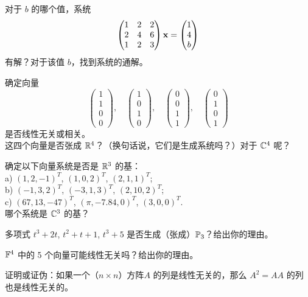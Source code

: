 \begin{problemset}
\item \label{ex:02-03-01} 对于 $b$ 的哪个值，系统 $$\begin{pmatrix} 1 & 2 & 2 \\ 2 & 4 & 6 \\ 1 & 2 & 3 \end{pmatrix} \mathbf{x} = \begin{pmatrix} 1 \\ 4 \\ b \end{pmatrix}$$ 有解？对于该值 $b$，找到系统的通解。
\item \label{ex:02-03-02} 确定向量
$$\begin{pmatrix} 1 \\ 1 \\ 0 \\ 0 \end{pmatrix},\quad \begin{pmatrix} 1 \\ 0 \\ 1 \\ 0 \end{pmatrix},\quad \begin{pmatrix} 0 \\ 0 \\ 1 \\ 1 \end{pmatrix},\quad \begin{pmatrix} 0 \\ 1 \\ 0 \\ 1 \end{pmatrix}$$
是否线性无关或相关。
\\
这四个向量是否张成 $\mathbb{R}^4$？（换句话说，它们是生成系统吗？）对于 $\mathbb{C}^4$ 呢？
\item \label{ex:02-03-03} 确定以下向量系统是否是 $\mathbb{R}^3$ 的基：
\\
a) $(1, 2, -1)^T$, $(1, 0, 2)^T$, $(2, 1, 1)^T$;
\\
b) $(-1, 3, 2)^T$, $(-3, 1, 3)^T$, $(2, 10, 2)^T$;
\\
c) $(67, 13, -47)^T$, $(\pi, -7.84, 0)^T$, $(3, 0, 0)^T$.
\\
哪个系统是 $\mathbb{C}^3$ 的基？
\item \label{ex:02-03-04} 多项式 $t^3 + 2t$, $t^2 + t + 1$, $t^3 + 5$ 是否生成（张成）$\mathbb{P}_3$？给出你的理由。
\item \label{ex:02-03-05} $\mathbb{F}^4$ 中的 5 个向量可能线性无关吗？给出你的理由。
\item \label{ex:02-03-06} 证明或证伪：如果一个（$n \times n$）方阵$A$ 的列是线性无关的，那么 $A^2 = AA$ 的列也是线性无关的。

\end{problemset}
